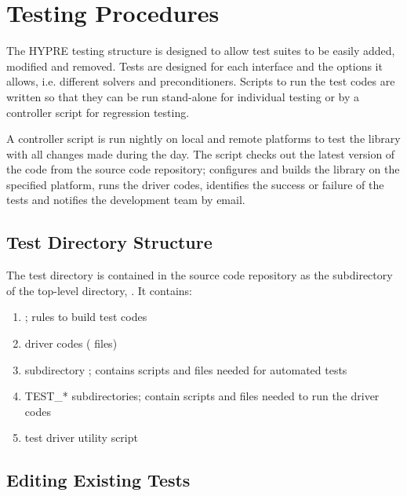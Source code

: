 \chapter{Testing Procedures}
\label{Testing Procedures}

The HYPRE testing structure is designed to allow test suites to be easily added,
modified and removed.  Tests are designed for each interface and the options it
allows, i.e. different solvers and preconditioners.  Scripts to run the test codes 
are written so that they can be run stand-alone for individual testing or by a 
controller script for regression testing.

A controller script is run nightly on local and remote platforms to test the 
library with all changes made during the day.  The script checks out the latest 
version of the code from the source code repository; configures and builds the
library on the specified platform, runs the driver codes, identifies the success
or failure of the tests and notifies the development team by email. 

\section{Test Directory Structure}
\label{Test Directory Structure}

The test directory is contained in the source code repository as the  
subdirectory of the top-level directory, .  It contains:
\begin{enumerate}
\item {}; rules to build test codes
\item driver codes ( files)
\item subdirectory ; contains scripts and files needed for automated tests 
\item TEST\_* subdirectories; contain scripts and files needed to run the driver codes 
\item {} test driver utility script
\end{enumerate}

\section{Editing Existing Tests}
\label{Editing Existing Tests}

